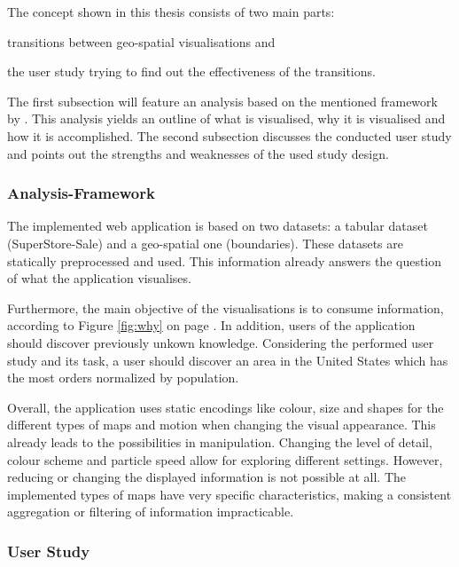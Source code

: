 \cbstart
The concept shown in this thesis consists of two main parts:
\begin{enumerate*}[label={(\arabic*)}]
\item transitions between geo-spatial visualisations and
\item the user study trying to find out the effectiveness of the transitions.
\end{enumerate*}

The first subsection will feature an analysis based on the mentioned framework by \citeauthor{Munzner2014}. This analysis yields an outline of what is visualised, why it is visualised and how it is accomplished. The second subsection discusses the conducted user study and points out the strengths and weaknesses of the used study design.
\cbend

\subsubsection{Analysis-Framework}
The implemented web application is based on two datasets: a tabular dataset (SuperStore-Sale) and a geo-spatial one (boundaries). These datasets are statically preprocessed and used. This information already answers the question of what the application visualises.

\cbstart
Furthermore, the main objective of the visualisations is to consume information, according to Figure \ref{fig:why} on page \pageref{fig:why}. In addition, users of the application should discover previously unkown knowledge. Considering the performed user study and its task, a user should discover an area in the United States which has the most orders normalized by population.
\cbend

Overall, the application uses static encodings like colour, size and shapes for the different types of maps and motion when changing the visual appearance. This already leads to the possibilities in manipulation. Changing the level of detail, colour scheme and particle speed allow for exploring different settings. However, reducing or changing the displayed information is not possible at all. The implemented types of maps have very specific characteristics, making a consistent aggregation or filtering of information impracticable.

\subsubsection{User Study}
\label{s:discussion-study}
